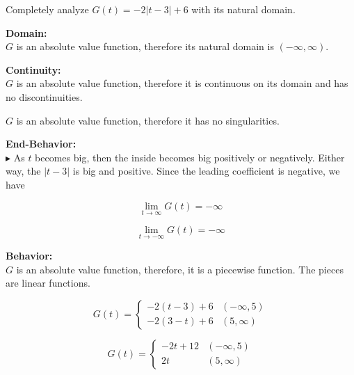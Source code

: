 \documentclass{ximera}
\author{Lee Wayand}
\begin{document}
\begin{exercise}



Completely analyze $G(t) = -2 | t - 3 | + 6$ with its natural domain.



\textbf{\textcolor{blue!55!black}{Domain:}}  \\

$G$ is an absolute value function, therefore its natural domain is $(-\infty, \infty)$.




\textbf{\textcolor{blue!55!black}{Continuity:}}  \\

$G$ is an absolute value function, therefore it is continuous on its domain and has no discontinuities.


$G$ is an absolute value function, therefore it has no singularities.








\textbf{\textcolor{blue!55!black}{End-Behavior:}}  \\




$\blacktriangleright$ As $t$ becomes big, then the inside becomes big positively or negatively.  Either way, the $| t - 3|$  is big and positive.  Since the leading coefficient is negative, we have

\[
\lim\limits_{t \to \infty} G(t) = -\infty
\]


\[
\lim\limits_{t \to -\infty} G(t) = -\infty
\]





\textbf{\textcolor{blue!55!black}{Behavior:}}  \\

$G$ is an absolute value function, therefore, it is a piecewise function.  The pieces are linear functions.






\[
G(t) = 
\begin{cases}
  -2 ( t - 3 ) + 6 & (-\infty, 5)\\
  -2 (3 - t) + 6 & (5, \infty)
\end{cases}
\]




\[
G(t) = 
\begin{cases}
  -2 t + 12 & (-\infty, 5)\\
  2t  & (5, \infty)
\end{cases}
\]





\end{exercise}
\end{document}
